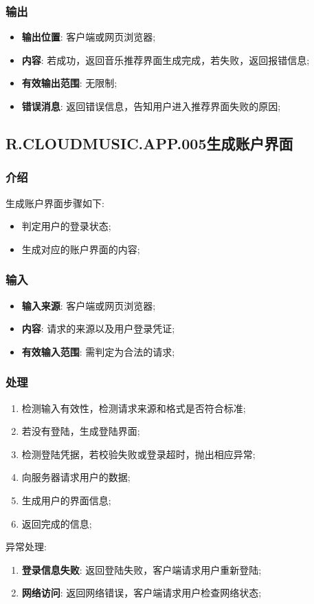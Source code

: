 \subsubsection{输出}
\begin{itemize}
	\item \textbf{输出位置}: 客户端或网页浏览器;
	\item \textbf{内容}: 若成功，返回音乐推荐界面生成完成，若失败，返回报错信息;
	\item \textbf{有效输出范围}: 无限制;
	\item \textbf{错误消息}: 返回错误信息，告知用户进入推荐界面失败的原因;
\end{itemize}

\subsection{R.CLOUDMUSIC.APP.005生成账户界面}
\subsubsection{介绍}
	生成账户界面步骤如下: 
	\begin{itemize}
		\item 判定用户的登录状态;
		\item 生成对应的账户界面的内容;
	\end{itemize}
\subsubsection{输入}
	\begin{itemize}
		\item \textbf{输入来源}: 客户端或网页浏览器;
		\item \textbf{内容}: 请求的来源以及用户登录凭证;
		\item \textbf{有效输入范围}: 需判定为合法的请求;
	\end{itemize}
\subsubsection{处理}
	\begin{enumerate}
		\item 检测输入有效性，检测请求来源和格式是否符合标准;
		\item 若没有登陆，生成登陆界面;
		\item 检测登陆凭据，若校验失败或登录超时，抛出相应异常;
		\item 向服务器请求用户的数据;
		\item 生成用户的界面信息;
		\item 返回完成的信息;
	\end{enumerate}
	\noindent 异常处理: 
	\begin{enumerate}
		\item \textbf{登录信息失败}: 返回登陆失败，客户端请求用户重新登陆;
		\item \textbf{网络访问}: 返回网络错误，客户端请求用户检查网络状态;
	\end{enumerate}
